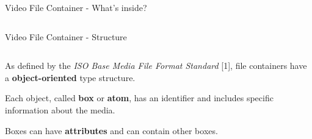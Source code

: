 \begin{tframe}{Video File Container - What's inside?}
\begin{minipage}{\textwidth}
\begin{columns}[T]
\end{columns}
\end{minipage}

\end{tframe}

\begin{tframe}{Video File Container - Structure}

\vspace{0.5cm}

\begin{minipage}{\textwidth}
\begin{columns}[T]

\begin{column}{0.55\textwidth}

As defined by the \emph{ISO Base Media File Format Standard} [1], file containers have a \textbf{object-oriented} type structure.

\vspace{0.5cm}

Each object, called \textbf{box} or \textbf{atom}, has an identifier and includes specific information about the media.

\vspace{0.5cm}

Boxes can have \textbf{attributes} and can contain other boxes.

\end{column}


\end{columns}
\end{minipage}
\end{tframe}

